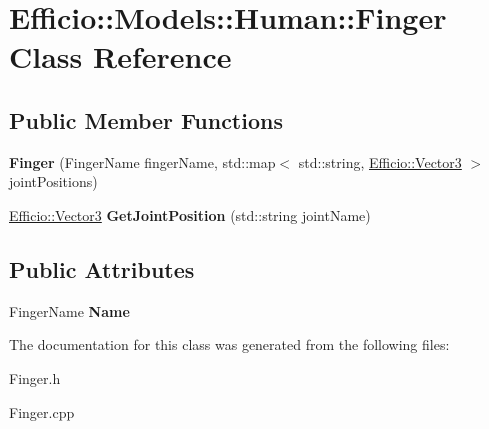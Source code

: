 \hypertarget{class_efficio_1_1_models_1_1_human_1_1_finger}{}\section{Efficio\+:\+:Models\+:\+:Human\+:\+:Finger Class Reference}
\label{class_efficio_1_1_models_1_1_human_1_1_finger}
\subsection*{Public Member Functions}
\begin{DoxyCompactItemize}
\item 
{\bfseries Finger} (Finger\+Name finger\+Name, std\+::map$<$ std\+::string, \hyperlink{class_efficio_1_1_vector3}{Efficio\+::\+Vector3} $>$ joint\+Positions)\hypertarget{class_efficio_1_1_models_1_1_human_1_1_finger_adba563997e627ad79efc039f3189907f}{}\label{class_efficio_1_1_models_1_1_human_1_1_finger_adba563997e627ad79efc039f3189907f}

\item 
\hyperlink{class_efficio_1_1_vector3}{Efficio\+::\+Vector3} {\bfseries Get\+Joint\+Position} (std\+::string joint\+Name)\hypertarget{class_efficio_1_1_models_1_1_human_1_1_finger_acf814b30ef13a7495003aa073d1ea66a}{}\label{class_efficio_1_1_models_1_1_human_1_1_finger_acf814b30ef13a7495003aa073d1ea66a}

\end{DoxyCompactItemize}
\subsection*{Public Attributes}
\begin{DoxyCompactItemize}
\item 
Finger\+Name {\bfseries Name}\hypertarget{class_efficio_1_1_models_1_1_human_1_1_finger_ae73134fdf9c0ba485fce08abdf2e5e59}{}\label{class_efficio_1_1_models_1_1_human_1_1_finger_ae73134fdf9c0ba485fce08abdf2e5e59}

\end{DoxyCompactItemize}


The documentation for this class was generated from the following files\+:\begin{DoxyCompactItemize}
\item 
Finger.\+h\item 
Finger.\+cpp\end{DoxyCompactItemize}
